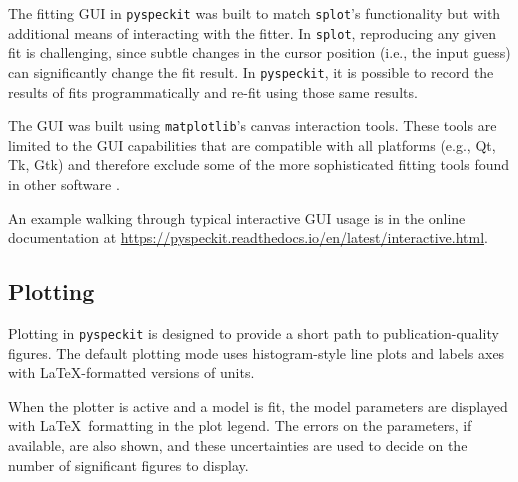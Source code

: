 \documentclass[twocolumn]{aastex63}
\newcommand{\pyspeckit}{\texttt{pyspeckit}\xspace}
\newcommand{\astropy}{\texttt{astropy}\xspace}
\begin{document}
The fitting GUI in \texttt{pyspeckit} was built to match \texttt{splot}'s
functionality but with additional means of interacting with the fitter.  In
\texttt{splot}, reproducing any given fit is challenging, since subtle changes
in the cursor position (i.e., the input guess) can significantly change the fit
result.  In \pyspeckit, it is possible to record the results of fits
programmatically and re-fit using those same results.

The GUI was built using \texttt{matplotlib}'s canvas interaction tools.  These
tools are limited to the GUI capabilities that are compatible with all platforms
(e.g., Qt, Tk, Gtk) and therefore exclude some of the more sophisticated fitting
tools found in other software \citep[e.g., \texttt{glue};][]{Beaumont2014b}. 

An example walking through typical interactive GUI usage is in the online
documentation at \url{https://pyspeckit.readthedocs.io/en/latest/interactive.html}.

\subsection{Plotting}
Plotting in \pyspeckit is designed to provide a short path to
publication-quality figures.  The default plotting mode uses histogram-style
line plots and labels axes with \LaTeX-formatted versions of units.

When the plotter is active and a model is fit, the model parameters are
displayed with \LaTeX~formatting in the plot legend.  The errors on the
parameters, if available, are also shown, and these uncertainties are used to
decide on the number of significant figures to display.

\end{document}
